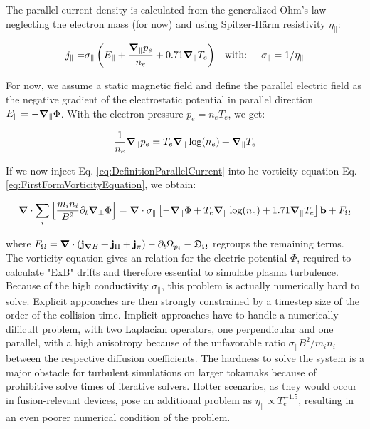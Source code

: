The parallel current density is calculated from the generalized Ohm's law neglecting the electron mass (for now) and using Spitzer-Härm resistivity $\eta_\parallel$:
 
\begin{align} 
 	\label{eq:DefinitionParallelCurrent}
 	j_\parallel =& \sigma_\parallel \left(E_\parallel + \frac{\grad_\parallel p_e}{n_e} + 0.71\grad_\parallel T_e\right) & \text{with: }&& \sigma_\parallel = 1/\eta_\parallel
 \end{align}

For now, we assume a static magnetic field and define the parallel electric field as the negative gradient of the electrostatic potential in parallel direction $E_\parallel=-\grad_\parallel\Phi$. With the electron pressure $p_e=n_eT_e$, we get:  
 
$$\frac{1}{n_e}\grad_\parallel p_e = T_e\grad_\parallel\log(n_e) + \grad_\parallel T_e$$

If we now inject Eq. \ref{eq:DefinitionParallelCurrent} into he vorticity equation Eq. \ref{eq:FirstFormVorticityEquation}, we obtain: 
 
\begin{equation}
	\label{eq:S3X_ElectrostaticVorticityEquation}
	 \grad\cdot\sum_{i}\left[\frac{m_i n_i}{ B^2}\partial_t\grad_\perp\Phi\right]  = \grad\cdot\sigma_\parallel \left[-\grad_\parallel\Phi +  T_e\grad_\parallel\log(n_e) + 1.71\grad_\parallel T_e\right]\mathbf{b} + F_\Omega
\end{equation}


where $F_\Omega = \grad\cdot\left(\mathbf{j}_{\grad B} + \mathbf{j}_{\Pi} + \mathbf{j}_{\pi}\right) - \partial_t \Omega_{p_i}  - \mathfrak{D}_\Omega$ regroups the remaining terms. \\
The vorticity equation gives an relation for the electric potential $\Phi$, required to calculate "ExB" drifts and therefore essential to simulate plasma turbulence. Because of the high conductivity $\sigma_\parallel$, this problem is actually numerically hard to solve. Explicit approaches are then strongly constrained by a timestep size of the order of the collision time. Implicit approaches have to handle a numerically difficult problem, with two Laplacian operators, one perpendicular and one parallel, with a high anisotropy because of the unfavorable ratio $\sigma_\parallel B^2 / m_in_i$ between the respective diffusion coefficients. The hardness to solve the system is a major obstacle for turbulent simulations on larger tokamaks because of prohibitive solve times of iterative solvers. Hotter scenarios, as they would occur in fusion-relevant devices, pose an additional problem as $\eta_\parallel\propto T_e^{-1.5}$, resulting in an even poorer numerical condition of the problem. 



